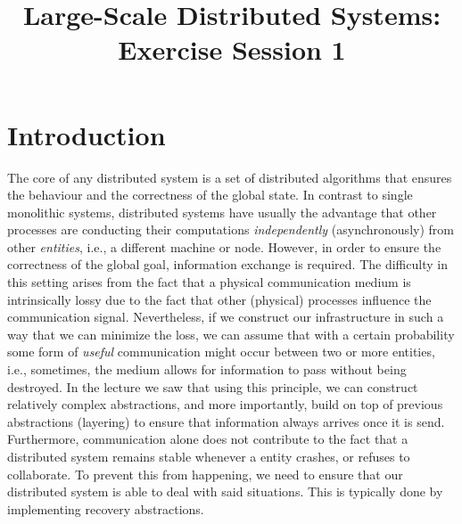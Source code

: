 

\title{Large-Scale Distributed Systems: Exercise Session 1}
\maketitle

\section{Introduction}
\label{sec:introduction}

The core of any distributed system is a set of distributed algorithms that ensures the behaviour and the correctness of the global state. In contrast to single monolithic systems, distributed systems have usually the advantage that other processes are conducting their computations \emph{independently} (asynchronously) from other \emph{entities}, i.e., a different machine or node. However, in order to ensure the correctness of the global goal, information exchange is required. The difficulty in this setting arises from the fact that a physical communication medium is intrinsically lossy due to the fact that other (physical) processes influence the communication signal. Nevertheless, if we construct our infrastructure in such a way that we can minimize the loss, we can assume that with a certain probability some form of \emph{useful} communication might occur between two or more entities, i.e., sometimes, the medium allows for information to pass without being destroyed. In the lecture we saw that using this principle, we can construct relatively complex abstractions, and more importantly, build on top of previous abstractions (layering) to ensure that information always arrives once it is send. Furthermore, communication alone does not contribute to the fact that a distributed system remains stable whenever a entity crashes, or refuses to collaborate. To prevent this from happening, we need to ensure that our distributed system is able to deal with said situations. This is typically done by implementing recovery abstractions.\\


